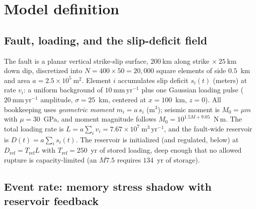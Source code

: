 \documentclass[11pt]{article}
\newcommand{\Dres}{D}
\newcommand{\Dref}{D_{\mathrm{ref}}}
\newcommand{\Ltot}{L}
\begin{document}
\section{Model definition}
\label{sec:model}

\subsection{Fault, loading, and the slip-deficit field}

The fault is a planar vertical strike-slip surface, $200\ \mathrm{km}$ along strike
$\times\ 25\ \mathrm{km}$ down dip, discretized into $N = 400\times50 = 20{,}000$
square elements of side $0.5$~km and area $a = 2.5\times10^{5}\ \mathrm{m^2}$. Element
$i$ accumulates slip deficit $s_i(t)$ (meters) at rate $v_i$: a uniform background of
$10\ \mathrm{mm\,yr^{-1}}$ plus one Gaussian loading pulse ($20\ \mathrm{mm\,yr^{-1}}$
amplitude, $\sigma = 25$~km, centered at $x=100$~km, $z=0$). All bookkeeping uses
\emph{geometric moment} $m_i = a\,s_i$ ($\mathrm{m^3}$); seismic moment is
$M_0 = \mu m$ with $\mu = 30$~GPa, and moment magnitude follows
$M_0 = 10^{1.5M + 9.05}$~N\,m. The total loading rate is
$\Ltot = a\sum_i v_i = 7.67\times10^{7}\ \mathrm{m^3\,yr^{-1}}$, and the fault-wide
reservoir is $\Dres(t) = a\sum_i s_i(t)$. The reservoir is initialized (and regulated,
below) at $\Dref = T_{\mathrm{ref}}\Ltot$ with $T_{\mathrm{ref}} = 250$~yr of stored
loading, deep enough that no allowed rupture is capacity-limited (an $M7.5$ requires
$134$~yr of storage).

\subsection{Event rate: memory stress shadow with reservoir feedback}
\label{sec:rate}
\end{document}
